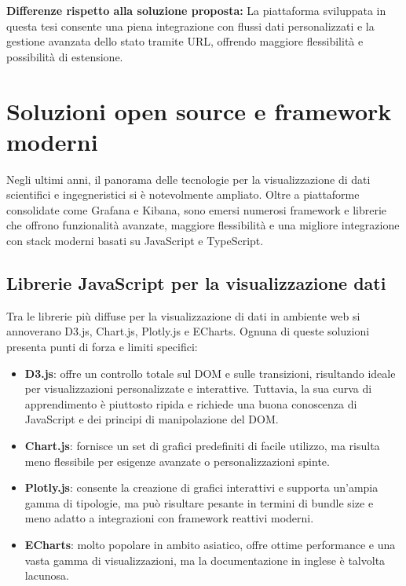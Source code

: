 \textbf{Differenze rispetto alla soluzione proposta:}
La piattaforma sviluppata in questa tesi consente una piena integrazione con flussi dati personalizzati e la gestione avanzata dello stato tramite URL, offrendo maggiore flessibilità e possibilità di estensione.

\section{Soluzioni open source e framework moderni}

Negli ultimi anni, il panorama delle tecnologie per la visualizzazione di dati scientifici e ingegneristici si è notevolmente ampliato. Oltre a piattaforme consolidate come Grafana e Kibana, sono emersi numerosi framework e librerie che offrono funzionalità avanzate, maggiore flessibilità e una migliore integrazione con stack moderni basati su JavaScript e TypeScript.

\subsection{Librerie JavaScript per la visualizzazione dati}

Tra le librerie più diffuse per la visualizzazione di dati in ambiente web si annoverano D3.js, Chart.js, Plotly.js e ECharts. Ognuna di queste soluzioni presenta punti di forza e limiti specifici:

\begin{itemize}
    \item \textbf{D3.js}: offre un controllo totale sul DOM e sulle transizioni, risultando ideale per visualizzazioni personalizzate e interattive. Tuttavia, la sua curva di apprendimento è piuttosto ripida e richiede una buona conoscenza di JavaScript e dei principi di manipolazione del DOM.
    \item \textbf{Chart.js}: fornisce un set di grafici predefiniti di facile utilizzo, ma risulta meno flessibile per esigenze avanzate o personalizzazioni spinte.
    \item \textbf{Plotly.js}: consente la creazione di grafici interattivi e supporta un'ampia gamma di tipologie, ma può risultare pesante in termini di bundle size e meno adatto a integrazioni con framework reattivi moderni.
    \item \textbf{ECharts}: molto popolare in ambito asiatico, offre ottime performance e una vasta gamma di visualizzazioni, ma la documentazione in inglese è talvolta lacunosa.
\end{itemize}

